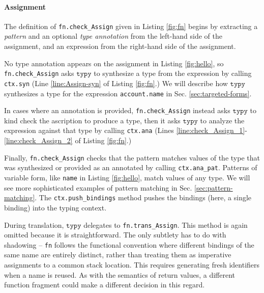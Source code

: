 \documentclass[preprint,10pt]{sigplanconf}
\newcommand{\typy}{\texttt{typy}}
\newcommand{\lip}[1]{\lstinline[language=Python,basicstyle=\ttfamily\footnotesize,deletendkeywords={tuple,buffer,map}]{#1}}
\newcommand{\li}[1]{\lip{#1}}
\begin{document}
\vspace{-3px}\paragraph{Assignment}
The definition of \li{fn.check_Assign} given in Listing \ref{fig:fn} begins by extracting a \emph{pattern} and an optional \emph{type annotation} from the left-hand side of the assignment, and an expression from the right-hand side of the assignment. 


No type annotation appears on the assignment in Listing \ref{fig:hello}, so \li{fn.check_Assign} asks $\typy$ to synthesize a type from the expression by calling \li{ctx.syn} (Line \ref{line:Assign-syn} of Listing \ref{fig:fn}.) We will describe how $\typy$ synthesizes a type for the expression \li{account.name} in Sec. \ref{sec:targeted-forms}.

In cases where an annotation is provided, \li{fn.check_Assign} instead  asks $\typy$ to kind check the ascription to produce a type, then it asks $\typy$ to analyze the expression against that type by calling \li{ctx.ana} (Lines \ref{line:check_Assign_1}-\ref{line:check_Assign_2} of Listing \ref{fig:fn}.)

Finally, \li{fn.check_Assign} checks that the pattern matches values of the type that was synthesized or provided as an annotated by calling \li{ctx.ana_pat}. Patterns of variable form, like \li{name} in Listing \ref{fig:hello}, match values of any type. We will see more sophisticated examples of pattern matching in Sec. \ref{sec:pattern-matching}. The \li{ctx.push_bindings} method pushes the bindings (here, a single binding) into the typing context.

During translation, $\typy$ delegates to \li{fn.trans_Assign}. This method is again omitted because it is straightforward. The only subtlety has to do with shadowing -- \li{fn} follows the functional  convention where different bindings of the same name are entirely distinct, rather than treating them as imperative assignments to a common stack location. This requires generating fresh identifiers when a name is reused. As with the semantics of return values, a different function fragment could make a different decision in this regard.
\end{document}
